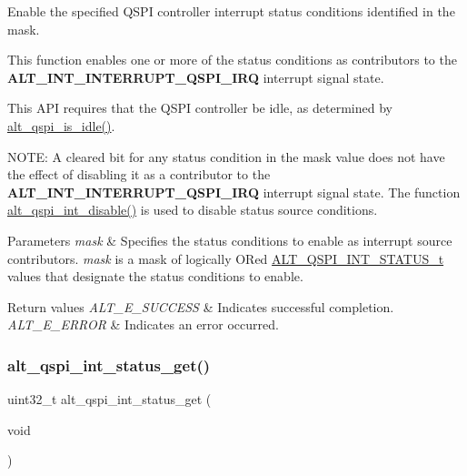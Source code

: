 Enable the specified Q\+S\+PI controller interrupt status conditions identified in the mask.

This function enables one or more of the status conditions as contributors to the {\bfseries{A\+L\+T\+\_\+\+I\+N\+T\+\_\+\+I\+N\+T\+E\+R\+R\+U\+P\+T\+\_\+\+Q\+S\+P\+I\+\_\+\+I\+RQ}} interrupt signal state.

This A\+PI requires that the Q\+S\+PI controller be idle, as determined by \mbox{\hyperlink{group__ALT__QSPI__CSR_gaeaa7e762d8b79b1989385c978174b7b8}{alt\+\_\+qspi\+\_\+is\+\_\+idle()}}.

N\+O\+TE\+: A cleared bit for any status condition in the mask value does not have the effect of disabling it as a contributor to the {\bfseries{A\+L\+T\+\_\+\+I\+N\+T\+\_\+\+I\+N\+T\+E\+R\+R\+U\+P\+T\+\_\+\+Q\+S\+P\+I\+\_\+\+I\+RQ}} interrupt signal state. The function \mbox{\hyperlink{group__ALT__QSPI__CSR_gabafd6da28abc48578f144cbd6c85e224}{alt\+\_\+qspi\+\_\+int\+\_\+disable()}} is used to disable status source conditions.


\begin{DoxyParams}{Parameters}
{\em mask} & Specifies the status conditions to enable as interrupt source contributors. {\itshape mask} is a mask of logically OR\textquotesingle{}ed \mbox{\hyperlink{group__ALT__QSPI__CSR_ga9630d0374a96983752d4053c122665dd}{A\+L\+T\+\_\+\+Q\+S\+P\+I\+\_\+\+I\+N\+T\+\_\+\+S\+T\+A\+T\+U\+S\+\_\+t}} values that designate the status conditions to enable.\\
\hline
\end{DoxyParams}

\begin{DoxyRetVals}{Return values}
{\em A\+L\+T\+\_\+\+E\+\_\+\+S\+U\+C\+C\+E\+SS} & Indicates successful completion. \\
\hline
{\em A\+L\+T\+\_\+\+E\+\_\+\+E\+R\+R\+OR} & Indicates an error occurred. \\
\hline
\end{DoxyRetVals}
\mbox{\label{group__ALT__QSPI__CSR_ga6eeaf36913f59120b21affa31d6f9632}} 
\subsubsection{\texorpdfstring{alt\_qspi\_int\_status\_get()}{alt\_qspi\_int\_status\_get()}}
{\footnotesize\ttfamily uint32\+\_\+t alt\+\_\+qspi\+\_\+int\+\_\+status\+\_\+get (\begin{DoxyParamCaption}\item[{void}]{ }\end{DoxyParamCaption})}

